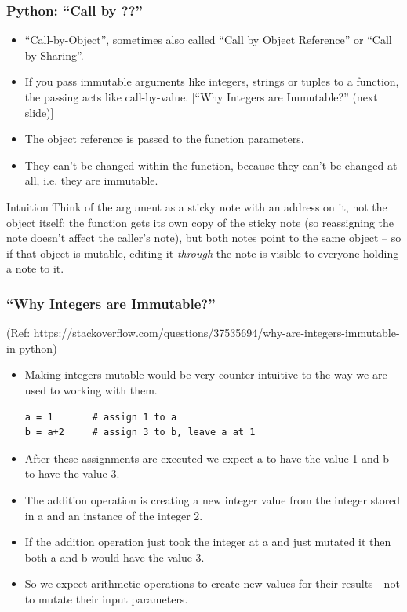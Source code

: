 \begin{frame}[fragile]\frametitle{Python: ``Call by ??'' }
    \begin{itemize}
    \item ``Call-by-Object'', sometimes also called ``Call by Object Reference'' or ``Call by Sharing''.
    \item If you pass immutable arguments like integers, strings or tuples to a function, the passing acts like call-by-value. [``Why Integers are Immutable?'' (next slide)]
    \item The object reference is passed to the function parameters.
    \item They can't be changed within the function, because they can't be changed at all, i.e. they are immutable.
            \end{itemize}
\begin{block}{Intuition}
Think of the argument as a sticky note with an address on it, not the object itself: the function gets its own copy of the sticky note (so reassigning the note doesn't affect the caller's note), but both notes point to the same object -- so if that object is mutable, editing it \emph{through} the note is visible to everyone holding a note to it.
\end{block}
\end{frame}


\begin{frame}[fragile]\frametitle{``Why Integers are Immutable?'' }
(Ref: https://stackoverflow.com/questions/37535694/why-are-integers-immutable-in-python)
    \begin{itemize}
    \item Making integers mutable would be very counter-intuitive to the way we are used to working with them.
    \begin{lstlisting}
a = 1       # assign 1 to a
b = a+2     # assign 3 to b, leave a at 1
\end{lstlisting}
    \item After these assignments are executed we expect a to have the value 1 and b to have the value 3. 
    \item The addition operation is creating a new integer value from the integer stored in a and an instance of the integer 2. 
    \item If the addition operation just took the integer at a and just mutated it then both a and b would have the value 3. 
    \item So we expect arithmetic operations to create new values for their results - not to mutate their input parameters.
            \end{itemize}
\end{frame}


